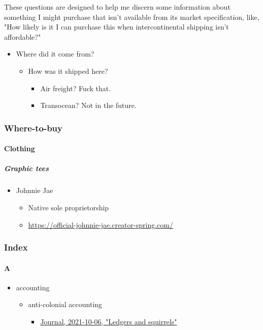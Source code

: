 \documentclass[11pt]{article}
\begin{document}
These questions are designed to help me discern some information about something I might purchase that isn't available from its market specification, like, "How likely is it I can purchase this when intercontinental shipping isn't affordable?"
\begin{itemize}
\item Where did it come from?
\begin{itemize}
\item How was it shipped here?
\begin{itemize}
\item Air freight? Fuck that.
\item Transocean? Not in the future.
\end{itemize}
\end{itemize}
\end{itemize}
\subsubsection*{Where-to-buy}
\label{sec:org2940a22}
\paragraph*{Clothing}
\label{sec:orgdf8b2b6}
\subparagraph*{Graphic tees}
\label{sec:orge48b4df}
\begin{itemize}
\item Johnnie Jae
\begin{itemize}
\item Native sole proprietorship
\item \url{https://official-johnnie-jae.creator-spring.com/}
\end{itemize}
\end{itemize}
\subsubsection*{Index}
\label{sec:orgbac6f2a}
\paragraph*{A}
\label{sec:org1414c7a}
\begin{itemize}
\item accounting
\begin{itemize}
\item anti-colonial accounting
\begin{itemize}
\item \href{emsenn.org}{Journal, 2021-10-06, "Ledgers and squirrels"}
\end{itemize}
\end{itemize}
\end{itemize}
\end{document}
